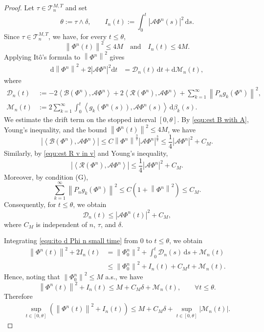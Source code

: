\documentclass[11pt, reqno]{amsart}
\theoremstyle{definition}
\numberwithin{equation}{section}
\newcommand{\dt}{\mathrm{d}t}
\newcommand{\norm}[1]{\left\|{#1}\right\|}
\newcommand{\inpro}[2]{\left\langle#1,#2\right\rangle}
\newcommand{\abs}[1]{\left|{#1}\right|}
\begin{document}
\begin{proof}
	Let $\tau\in\mathcal T_n^{M,T}$ and set
	\[
	\theta:=\tau\wedge\delta,
	\qquad
	I_n(t):=
	\int_0^t
	\abs{\mathcal A\Phi^n(s)}^2\,\mathrm ds .
	\]
	Since $\tau\in\mathcal T_n^{M,T}$, we have, for every $t\leq \theta$,
	\[
	\norm{\Phi^n(t)}^2\leq 4M \quad \text{and}
	\quad
	I_n(t)\leq 4M .
	\]
	Applying It\^o's formula to $\norm{\Phi^n}^2$ gives
	\begin{align}\label{equ:ito d Phi n small time}
		\mathrm{d} \norm{\Phi^{n}}^2
		+
		2 \abs{\mathcal{A} \Phi^{n}}^2 \dt
		&=
		\mathcal{D}_n(t)\,\dt
		+
		\mathrm d\mathcal M_n(t),
	\end{align}
	where
	\begin{align*}
	\mathcal{D}_n(t)
		&:=
		-2\inpro{\mathcal{B}(\Phi^n)}{\mathcal{A}\Phi^{n}}
		+
		2\inpro{\mathcal{R}(\Phi^n)}{\mathcal{A} \Phi^{n}}
		+
		\sum_{k=1}^\infty \norm{P_n g_k(\Phi^n)}^2,
		\\
		\mathcal M_n(t)
		&:=
		2\sum_{k=1}^\infty
		\int_0^t
		\inpro{g_k(\Phi^n(s))}{\mathcal A\Phi^n(s)}
		\,\mathrm d\beta_k(s).
	\end{align*}
	We estimate the drift term on the stopped interval $[0,\theta]$. By
	\eqref{equ:est B with A}, Young's inequality, and the bound
	$\norm{\Phi^n(t)}^2\leq 4M$, we have
	\[
	\abs{\inpro{\mathcal B(\Phi^n)}{\mathcal A\Phi^n}}
	\leq
	C\norm{\Phi^n}^{\frac32}
	\abs{\mathcal A\Phi^n}^{\frac32}
	\leq
	\frac14\abs{\mathcal A\Phi^n}^2+C_M .
	\]
	Similarly, by \eqref{equ:est R v in v} and Young's inequality,
	\[
	\abs{\inpro{\mathcal R(\Phi^n)}{\mathcal A\Phi^n}}
	\leq
	\frac14\abs{\mathcal A\Phi^n}^2+C_M .
	\]
	Moreover, by condition {\rm (G)},
	\[
	\sum_{k=1}^\infty \norm{P_n g_k(\Phi^n)}^2
	\leq
	C\left(1+\norm{\Phi^n}^2\right)
	\leq C_M .
	\]
	Consequently, for $t\leq\theta$, we obtain
	\[
	\mathcal{D}_n(t)\leq \abs{\mathcal A\Phi^n(t)}^2+C_M,
	\]
	where $C_M$ is independent of $n$, $\tau$, and $\delta$.
	
	Integrating \eqref{equ:ito d Phi n small time} from $0$ to $t\leq\theta$,
	we obtain
	\[
	\begin{aligned}
		\norm{\Phi^n(t)}^2+2I_n(t)
		&=
		\norm{\Phi_0^n}^2
		+
		\int_0^t \mathcal{D}_n(s)\,\mathrm ds
		+
		\mathcal M_n(t)
		\\
		&\leq
		\norm{\Phi_0^n}^2
		+
		I_n(t)
		+
		C_Mt
		+
		\mathcal M_n(t).
	\end{aligned}
	\]
	Hence, noting that $\norm{\Phi_0^n}^2\leq M$ a.s., we have
	\[
	\norm{\Phi^n(t)}^2+I_n(t)
	\leq
	M+C_M\delta+\mathcal M_n(t),
	\qquad \forall t\leq\theta .
	\]
	Therefore
	\begin{align}\label{equ:running-energy-bound}
		\sup_{t\in[0,\theta]}
		\left(
		\norm{\Phi^n(t)}^2+I_n(t)
		\right)
		\leq
		M+C_M\delta
		+
		\sup_{t\in[0,\theta]}\abs{\mathcal M_n(t)} .
	\end{align}
	

\end{proof}
\end{document}
